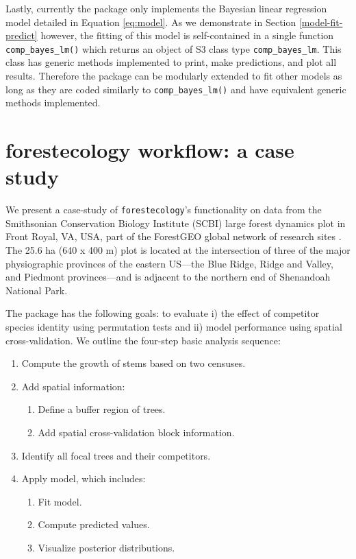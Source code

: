 \documentclass[12pt]{article}
\providecommand{\tightlist}{%
  \setlength{\itemsep}{0pt}\setlength{\parskip}{0pt}}
\begin{document}
Lastly, currently the package only implements the Bayesian linear
regression model detailed in Equation \ref{eq:model}. As we demonstrate
in Section \ref{model-fit-predict} however, the fitting of this model is
self-contained in a single function \texttt{comp\_bayes\_lm()} which
returns an object of S3 class type \texttt{comp\_bayes\_lm}. This class
has generic methods implemented to print, make predictions, and plot all
results. Therefore the package can be modularly extended to fit other
models as long as they are coded similarly to \texttt{comp\_bayes\_lm()}
and have equivalent generic methods implemented.

\hypertarget{casestudy}{%
\section{forestecology workflow: a case study}\label{casestudy}}

We present a case-study of \texttt{forestecology}'s functionality on
data from the Smithsonian Conservation Biology Institute (SCBI) large
forest dynamics plot in Front Royal, VA, USA, part of the ForestGEO
global network of research sites
\citep[\citet{andersonteixeira_ctfs-forestgeo_2015},
\citet{davies_forestgeo_2021}]{bourg_initial_2013}. The 25.6 ha (640 x
400 m) plot is located at the intersection of three of the major
physiographic provinces of the eastern US---the Blue Ridge, Ridge and
Valley, and Piedmont provinces---and is adjacent to the northern end of
Shenandoah National Park.

The package has the following goals: to evaluate i) the effect of
competitor species identity using permutation tests and ii) model
performance using spatial cross-validation. We outline the four-step
basic analysis sequence:

\begin{enumerate}
\def\labelenumi{\arabic{enumi}.}
\tightlist
\item
  Compute the growth of stems based on two censuses.
\item
  Add spatial information:

  \begin{enumerate}
  \def\labelenumii{\arabic{enumii}.}
  \tightlist
  \item
    Define a buffer region of trees.
  \item
    Add spatial cross-validation block information.
  \end{enumerate}
\item
  Identify all focal trees and their competitors.
\item
  Apply model, which includes:

  \begin{enumerate}
  \def\labelenumii{\arabic{enumii}.}
  \tightlist
  \item
    Fit model.
  \item
    Compute predicted values.
  \item
    Visualize posterior distributions.
  \end{enumerate}
\end{enumerate}
\end{document}
